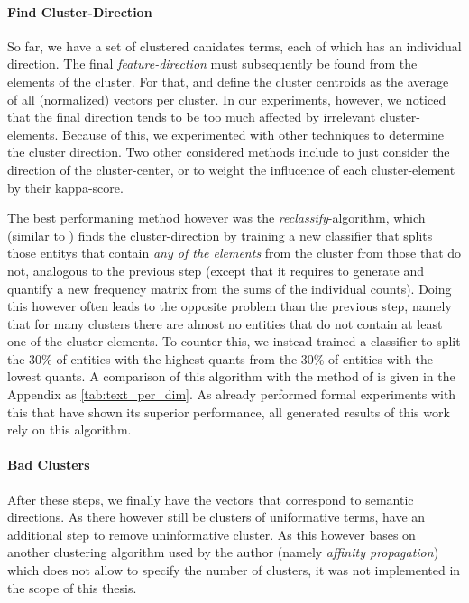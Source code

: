 \paragraph{Find Cluster-Direction}

So far, we have a set of clustered canidates terms, each of which has an individual direction. The final \textit{feature-direction} must subsequently be found from the elements of the cluster. For that, \cite{Derrac2015} and \cite{Ager2018} define the cluster centroids as the average of all (normalized) vectors per cluster. In our experiments, however, we noticed that the final direction tends to be too much affected by irrelevant cluster-elements. Because of this, we experimented with other techniques to determine the cluster direction. Two other considered methods include to just consider the direction of the cluster-center, or to weight the influcence of each cluster-element by their kappa-score.

The best performaning method however was the \textit{reclassify}-algorithm, which (similar to \cite{Alshaikh2020}) finds the cluster-direction by training a new classifier that splits those \glspl{entity} that contain \textit{any of the elements} from the cluster from those that do not, analogous to the previous step (except that it requires to generate and quantify a new frequency matrix from the sums of the individual counts). Doing this however often leads to the opposite problem than the previous step, namely that for many clusters there are almost no entities that do not contain at least one of the cluster elements. To counter this, we instead trained a classifier to split the 30\% of entities with the highest \glspl{quant} from the 30\% of entities with the lowest \glspl{quant}. A comparison of this algorithm with the method of \cite{Derrac2015} is given in the Appendix as \autoref{tab:text_per_dim}. As \cite{Alshaikh2020} already performed formal experiments with this that have shown its superior performance, all generated results of this work rely on this algorithm. 

\paragraph{Bad Clusters}

After these steps, we finally have the vectors that correspond to semantic directions. As there however still be clusters of uniformative terms, \textcite{Alshaikh2020} have an additional step to remove uninformative cluster. As this however bases on another clustering algorithm used by the author (namely \textit{affinity propagation}) which does not allow to specify the number of clusters, it was not implemented in the scope of this thesis.

